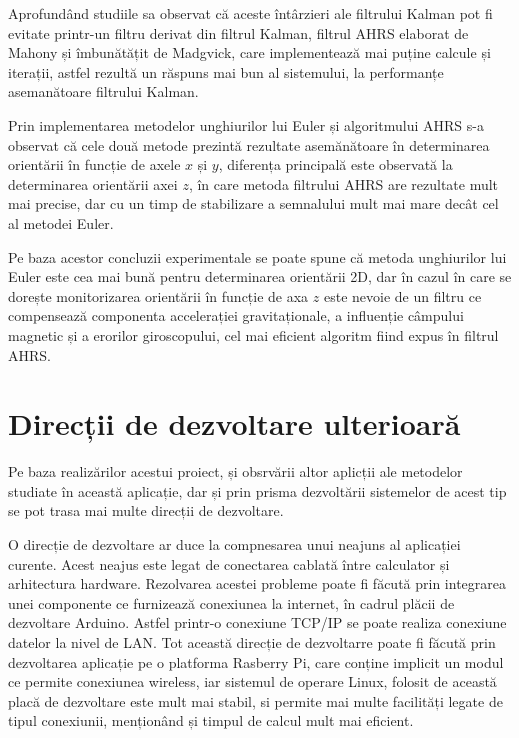 \-\hspace{1cm}Aprofundând studiile sa observat că aceste întârzieri ale filtrului Kalman pot fi evitate printr-un filtru derivat din filtrul Kalman, filtrul AHRS elaborat de Mahony și îmbunătățit de Madgvick, care implementează mai puține calcule și iterații, astfel rezultă un răspuns mai bun al sistemului, la performanțe asemanătoare filtrului Kalman.
   
\-\hspace{1cm}Prin implementarea metodelor unghiurilor lui Euler și algoritmului AHRS s-a observat că cele două metode prezintă rezultate asemănătoare în determinarea orientării în funcție de axele $x$ și $y$, diferența principală este observată la determinarea orientării axei $z$, în care metoda filtrului AHRS are rezultate mult mai precise, dar cu un timp de stabilizare a semnalului mult mai mare decât cel al metodei Euler.
 
\-\hspace{1cm}Pe baza acestor concluzii experimentale se poate spune că metoda unghiurilor lui Euler este cea mai bună pentru determinarea orientării 2D, dar în cazul în care se dorește monitorizarea orientării în funcție de axa $z$ este nevoie de un filtru ce compensează componenta accelerației gravitaționale, a influenție câmpului magnetic și a erorilor giroscopului, cel mai eficient algoritm fiind expus în filtrul AHRS.

\section{Direcții de dezvoltare ulterioară}
\-\hspace{1cm}Pe baza realizărilor acestui proiect, și obsrvării altor aplicții ale metodelor studiate în această aplicație, dar și prin prisma dezvoltării sistemelor de acest tip se pot trasa mai multe direcții de dezvoltare.

\-\hspace{1cm}O direcție de dezvoltare ar duce la compnesarea unui neajuns al aplicației curente. Acest neajus este legat de conectarea cablată între calculator și arhitectura hardware. Rezolvarea acestei probleme poate fi făcută prin integrarea unei componente ce furnizează conexiunea la internet, în cadrul plăcii de dezvoltare Arduino. Astfel printr-o conexiune TCP/IP se poate realiza conexiune datelor la nivel de LAN. Tot această direcție de dezvoltarre poate fi făcută prin dezvoltarea aplicație pe o platforma Rasberry Pi, care conține implicit un modul ce permite conexiunea wireless, iar sistemul de operare Linux, folosit de această placă de dezvoltare este mult mai stabil, si permite mai multe facilități legate de tipul conexiunii, menționând și timpul de calcul mult mai eficient. 

